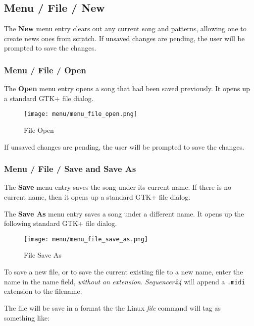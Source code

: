 \subsection{Menu / File / New}
\label{subsec:menu_file_new}

   The \textbf{New} menu entry clears out any current song and patterns,
   allowing one to create news ones from scratch.
   If unsaved changes are pending, the user will be prompted to save the
   changes.

\subsubsection{Menu / File / Open}
\label{subsubsec:seq24_menu_file_open}

   The \textbf{Open} menu entry opens a song that had been saved previously.
   It opens up a standard GTK+ file dialog.

\begin{figure}[H]
   \centering 
   \texttt{[image: menu/menu\_file\_open.png]}
   \caption{File Open}
   \label{fig:seq24_menu_file_open}
\end{figure}

   If unsaved changes are pending, the user will be prompted to save the
   changes.

\subsubsection{Menu / File / Save and Save As}
\label{subsubsec:menu_file_open_save_as}

   The \textbf{Save} menu entry saves the song under its current name.
   If there is no current name, then
   it opens up a standard GTK+ file dialog.

   The \textbf{Save As} menu entry saves a song under a different name.
   It opens up the following standard GTK+ file dialog.

\begin{figure}[H]
   \centering 
   \texttt{[image: menu/menu\_file\_save\_as.png]}
   \caption{File Save As}
   \label{fig:seq24_menu_file_save_as}
\end{figure}

   To save a new file, or to save the current existing file to a new name,
   enter the name in the name field, \textsl{without an extension}.
   \textsl{Sequencer24} will append a \texttt{.midi} extension to the filename.

   The file will be save in a format the the Linux \textsl{file} command
   will tag as something like:

